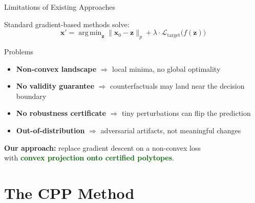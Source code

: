 \documentclass[aspectratio=169, 10pt]{beamer}
\newcommand{\vx}{\mathbf{x}}
\newcommand{\vz}{\mathbf{z}}
\DeclareMathOperator*{\argmin}{arg\,min}
\begin{document}
\begin{frame}{Limitations of Existing Approaches}

Standard gradient-based methods solve:
\[
  \vx' = \argmin_{\vz} \bigl\| \vx_0 - \vz \bigr\|_p + \lambda \cdot \mathcal{L}_{\text{target}}\!\bigl(f(\vz)\bigr)
\]

\begin{alertblock}{Problems}
\begin{itemize}
  \item \textbf{Non-convex landscape} $\Rightarrow$ local minima, no global optimality
  \item \textbf{No validity guarantee} $\Rightarrow$ counterfactuals may land near the decision boundary
  \item \textbf{No robustness certificate} $\Rightarrow$ tiny perturbations can flip the prediction
  \item \textbf{Out-of-distribution} $\Rightarrow$ adversarial artifacts, not meaningful changes
\end{itemize}
\end{alertblock}

\bigskip

\begin{center}
\textbf{Our approach:} replace gradient descent on a non-convex loss\\
with \textcolor{darkgreen}{\textbf{convex projection onto certified polytopes}}.
\end{center}

\end{frame}

\section{The CPP Method}
\end{document}
